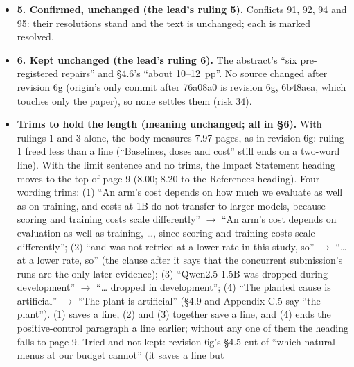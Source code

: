 \documentclass{article}
\theoremstyle{plain}
\theoremstyle{definition}
\theoremstyle{remark}
\begin{document}
\begin{itemize}
        as one paragraph of ``$|$'' text (in the LaTeX, as a second table with
        row 27 as its bold header); that blank line is removed. After the fixes
        the check finds nothing, and the Markdown PDF shows both lists as lists
        and the table as one table. The LaTeX lists were already right (the
        converter does not need the blank line); the [CITE-CHECK] table is now
        one longtable.
  \item \textbf{5. Confirmed, unchanged (the lead's ruling 5).} Conflicts 91,
        92, 94 and 95: their resolutions stand and the text is unchanged; each
        is marked resolved.
  \item \textbf{6. Kept unchanged (the lead's ruling 6).} The abstract's ``six
        pre-registered repairs'' and \S{}4.6's ``about 10--12~pp''. No source
        changed after revision 6g (origin's only commit after 76a08a0 is
        revision 6g, 6b48aea, which touches only the paper), so none settles
        them (risk 34).
  \item \textbf{Trims to hold the length (meaning unchanged; all in \S{}6).}
        With rulings 1 and 3 alone, the body measures 7.97 pages, as in revision
        6g: ruling 1 freed less than a line (``Baselines, doses and cost'' still
        ends on a two-word line). With the limit sentence and no trims, the
        Impact Statement heading moves to the top of page 9 (8.00; 8.20 to the
        References heading). Four wording trims: (1) ``An arm's cost depends on
        how much we evaluate as well as on training, and costs at 1B do not
        transfer to larger models, because scoring and training costs scale
        differently'' $\to$ ``An arm's cost depends on evaluation as well as
        training, \ldots{}, since scoring and training costs scale
        differently''; (2) ``and was not retried at a lower rate in this study,
        so'' $\to$ ``\ldots{} at a lower rate, so'' (the clause after it says
        that the concurrent submission's runs are the only later evidence); (3)
        ``Qwen2.5-1.5B was dropped during development'' $\to$ ``\ldots{} dropped
        in development''; (4) ``The planted cause is artificial'' $\to$ ``The
        plant is artificial'' (\S{}4.9 and Appendix C.5 say ``the plant''). (1)
        saves a line, (2) and (3) together save a line, and (4) ends the
        positive-control paragraph a line earlier; without any one of them the
        heading falls to page 9. Tried and not kept: revision 6g's \S{}4.5 cut
        of ``which natural menus at our budget cannot'' (it saves a line but

\end{itemize}
\end{document}
